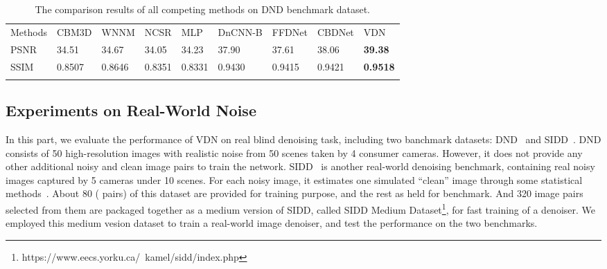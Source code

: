 \documentclass{article}
\begin{document}
\begin{table}[!t]
    \centering\vspace{-1mm}
    \caption{\small{The comparison results of all competing methods on DND benchmark dataset.}}\vspace{-2mm}
    \scriptsize
    \begin{tabular}{@{}C{1.5cm}@{}|@{}C{1.6cm}@{}@{}C{1.5cm}@{}@{}C{1.5cm}@{}@{}C{1.3cm}@{}@{}C{1.5cm}@{}@{}C{1.5cm}@{}
        @{}C{1.6cm}@{}@{}C{1.8cm}@{}}
        \Xhline{0.8pt}
        Methods & CBM3D    & WNNM    & NCSR   & MLP    & DnCNN-B          & FFDNet & CBDNet          & VDN \\
        \Xhline{0.4pt}
        PSNR    &34.51     & 34.67   & 34.05  & 34.23  & 37.90            & 37.61  &38.06            & \textbf{39.38}  \\
        \Xhline{0.4pt}     
        SSIM    &0.8507    & 0.8646  & 0.8351 & 0.8331 &0.9430            & 0.9415 &0.9421           & \textbf{0.9518}  \\
        \Xhline{0.8pt}
    \end{tabular}
    \label{tab:PSNR-DND}
    \vspace{-3mm}
\end{table}

\vspace{-4mm}\subsection{Experiments on Real-World Noise}\vspace{-2mm}
In this part, we evaluate the performance of VDN on real blind denoising task, including two banchmark
datasets: DND~\cite{plotz2017benchmarking} and SIDD~\cite{Abdelhamed_2018_CVPR}. DND consists of 50
high-resolution images with realistic noise from 50 scenes taken by 4 consumer cameras.
However, it does not provide any other additional noisy and clean image pairs to train the network.
SIDD~\cite{Abdelhamed_2018_CVPR} is another real-world denoising benchmark, containing  real noisy images captured
by 5 cameras under 10 scenes. For each noisy image, it estimates one simulated ``clean'' image through
some statistical methods~\cite{Abdelhamed_2018_CVPR}.
About 80 ( pairs) of this dataset are provided for training purpose, and the rest as held for benchmark.
And 320 image pairs selected from them are packaged together as a medium version of SIDD, called SIDD Medium
Dataset\footnote{\label{foot:SIDD}https://www.eecs.yorku.ca/~kamel/sidd/index.php},
for fast training of a denoiser.
We employed this medium vesion dataset to train a real-world image denoiser, and test the performance on the two benchmarks.
\end{document}
